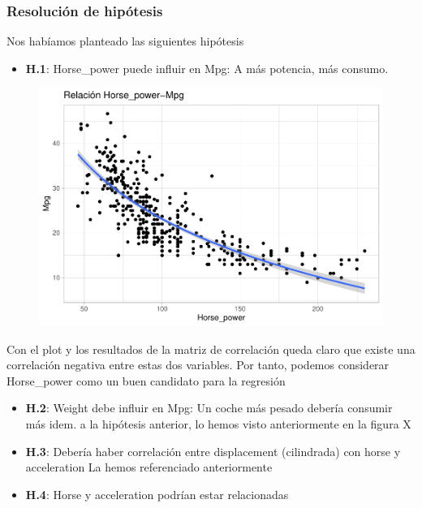 \subsubsection{Resolución de hipótesis}

Nos habíamos planteado las siguientes hipótesis

\begin{itemize}
\item \textbf{H.1}: Horse\_power puede influir en Mpg: A más potencia, más consumo.
\end{itemize}

\begin{figure}[H]\includegraphics[width=.9\linewidth]{img/EDA_files/figure-latex/unnamed-chunk-27-1} \caption{}\end{figure}

Con el plot y los resultados de la matriz de correlación queda claro que existe una correlación negativa entre estas dos variables. Por tanto, podemos considerar Horse\_power como un buen candidato para la regresión

\begin{itemize}
\item \textbf{H.2}: Weight debe influir en Mpg: Un coche más pesado debería consumir más idem. a la hipótesis anterior, lo hemos visto anteriormente en la figura X
\item \textbf{H.3}: Debería haber correlación entre displacement (cilindrada) con horse y acceleration La hemos referenciado anteriormente
\item \textbf{H.4}: Horse y acceleration podrían estar relacionadas
\end{itemize}

